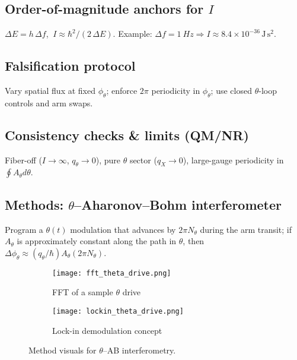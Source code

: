 
\subsection{Order-of-magnitude anchors for \texorpdfstring{$I$}{I}}\label{sec:iom}
$\Delta E=h\,\Delta f$, $\ I\approx \hbar^2/(2\,\Delta E)$. Example: $\Delta f=\SI{1}{Hz}\Rightarrow I\approx 8.4\times 10^{-36}\,\mathrm{J\,s^2}$.

\subsection{Falsification protocol}\label{sec:falsification}
Vary spatial flux at fixed $\phi_\theta$; enforce $2\pi$ periodicity in $\phi_\theta$; use closed $\theta$-loop controls and arm swaps.

\subsection{Consistency checks \& limits (QM/NR)}\label{sec:lab-consistency}
Fiber-off ($I\to\infty$, $q_\theta\to 0$), pure $\theta$ sector ($q_X\to 0$), large-gauge periodicity in $\oint A_\theta d\theta$.

\subsection{Methods: \texorpdfstring{$\theta$}{theta}--Aharonov--Bohm interferometer}\label{sec:methods-theta-ab}
Program a $\theta(t)$ modulation that advances by $2\pi N_\theta$ during the arm transit; if $A_\theta$ is approximately constant along the path in $\theta$, then $\Delta\phi_\theta \approx (q_\theta/\hbar) A_\theta (2\pi N_\theta)$.

\begin{figure}[htbp]
  \centering
  \begin{subfigure}[b]{0.48\linewidth}
    \centering
  \texttt{[image: fft\_theta\_drive.png]}
    \caption{FFT of a sample $\theta$ drive}
    \label{fig:fft-theta}
  \end{subfigure}\hfill
  \begin{subfigure}[b]{0.48\linewidth}
    \centering
  \texttt{[image: lockin\_theta\_drive.png]}
    \caption{Lock-in demodulation concept}
    \label{fig:lockin-theta}
  \end{subfigure}
  \caption{Method visuals for $\theta$--AB interferometry.}
  \label{fig:methods}
\end{figure}

